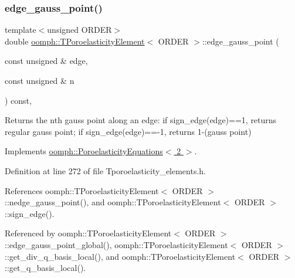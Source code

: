 \subsubsection{\texorpdfstring{edge\+\_\+gauss\+\_\+point()}{edge\_gauss\_point()}}
{\footnotesize\ttfamily template$<$unsigned O\+R\+D\+ER$>$ \\
double \hyperlink{classoomph_1_1TPoroelasticityElement}{oomph\+::\+T\+Poroelasticity\+Element}$<$ O\+R\+D\+ER $>$\+::edge\+\_\+gauss\+\_\+point (\begin{DoxyParamCaption}\item[{const unsigned \&}]{edge,  }\item[{const unsigned \&}]{n }\end{DoxyParamCaption}) const\hspace{0.3cm}{\ttfamily [inline]}, {\ttfamily [virtual]}}

Returns the nth gauss point along an edge\+: if sign\+\_\+edge(edge)==1, returns regular gauss point; if sign\+\_\+edge(edge)==-\/1, returns 1-\/(gauss point) 

Implements \hyperlink{classoomph_1_1PoroelasticityEquations_af1e01a7f1546cc7e4c19bc3a6de145da}{oomph\+::\+Poroelasticity\+Equations$<$ 2 $>$}.



Definition at line 272 of file Tporoelasticity\+\_\+elements.\+h.



References oomph\+::\+T\+Poroelasticity\+Element$<$ O\+R\+D\+E\+R $>$\+::nedge\+\_\+gauss\+\_\+point(), and oomph\+::\+T\+Poroelasticity\+Element$<$ O\+R\+D\+E\+R $>$\+::sign\+\_\+edge().



Referenced by oomph\+::\+T\+Poroelasticity\+Element$<$ O\+R\+D\+E\+R $>$\+::edge\+\_\+gauss\+\_\+point\+\_\+global(), oomph\+::\+T\+Poroelasticity\+Element$<$ O\+R\+D\+E\+R $>$\+::get\+\_\+div\+\_\+q\+\_\+basis\+\_\+local(), and oomph\+::\+T\+Poroelasticity\+Element$<$ O\+R\+D\+E\+R $>$\+::get\+\_\+q\+\_\+basis\+\_\+local().

\mbox{\label{classoomph_1_1TPoroelasticityElement_ae16942ca84bf7bc23eed93cdeb08efce}} 
